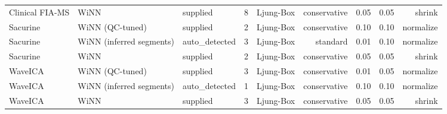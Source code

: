 \begin{landscape}
\begin{longtable}{lllrlrrrr}
Clinical FIA-MS & WiNN & supplied & 8 & Ljung-Box & conservative & 0.05 & 0.05 & shrink \\
Sacurine & WiNN (QC-tuned) & supplied & 2 & Ljung-Box & conservative & 0.10 & 0.10 & normalize \\
Sacurine & WiNN (inferred segments) & auto\_detected & 3 & Ljung-Box & standard & 0.01 & 0.10 & normalize \\
Sacurine & WiNN & supplied & 2 & Ljung-Box & conservative & 0.05 & 0.05 & shrink \\
WaveICA & WiNN (QC-tuned) & supplied & 3 & Ljung-Box & conservative & 0.01 & 0.05 & normalize \\
WaveICA & WiNN (inferred segments) & auto\_detected & 1 & Ljung-Box & conservative & 0.10 & 0.10 & normalize \\
WaveICA & WiNN & supplied & 3 & Ljung-Box & conservative & 0.05 & 0.05 & shrink \\
\end{longtable}
\end{landscape}
